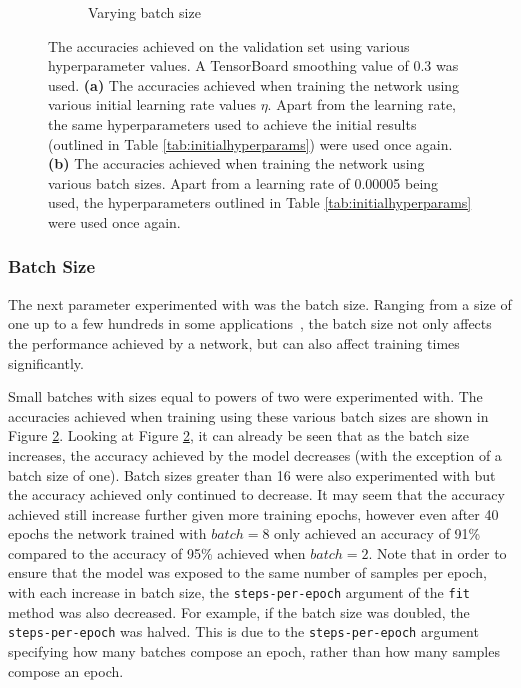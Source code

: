 \begin{figure}[!t]
\begin{subfigure}[b]{0.49\textwidth}
        \caption{Varying batch size}
        \label{fig:bsplot}
    \end{subfigure}
    \caption{The accuracies achieved on the validation set using various hyperparameter values. A TensorBoard smoothing value of 0.3 was used. \textbf{(a)} The accuracies achieved when training the network using various initial learning rate values $\eta$. Apart from the learning rate, the same hyperparameters used to achieve the initial results (outlined in Table \ref{tab:initialhyperparams}) were used once again. \textbf{(b)} The accuracies achieved when training the network using various batch sizes. Apart from a learning rate of 0.00005 being used, the hyperparameters outlined in Table \ref{tab:initialhyperparams} were used once again.}
\end{figure}

\subsubsection{Batch Size}

The next parameter experimented with was the batch size. Ranging from a size of one up to a few hundreds in some applications~\cite{bengio2012practical}, the batch size not only affects the performance achieved by a network, but can also affect training times significantly.

Small batches with sizes equal to powers of two were experimented with. The accuracies achieved when training using these various batch sizes are shown in Figure \ref{fig:bsplot}. Looking at Figure \ref{fig:bsplot}, it can already be seen that as the batch size increases, the accuracy achieved by the model decreases (with the exception of a batch size of one). Batch sizes greater than 16 were also experimented with but the accuracy achieved only continued to decrease. It may seem that the accuracy achieved still increase further given more training epochs, however even after 40 epochs the network trained with $batch=8$ only achieved an accuracy of 91\% compared to the accuracy of 95\% achieved when $batch=2$. Note that in order to ensure that the model was exposed to the same number of samples per epoch, with each increase in batch size, the \texttt{steps-per-epoch} argument of the \texttt{fit} method was also decreased. For example, if the batch size was doubled, the \texttt{steps-per-epoch} was halved. This is due to the \texttt{steps-per-epoch} argument specifying how many batches compose an epoch, rather than how many samples compose an epoch.

